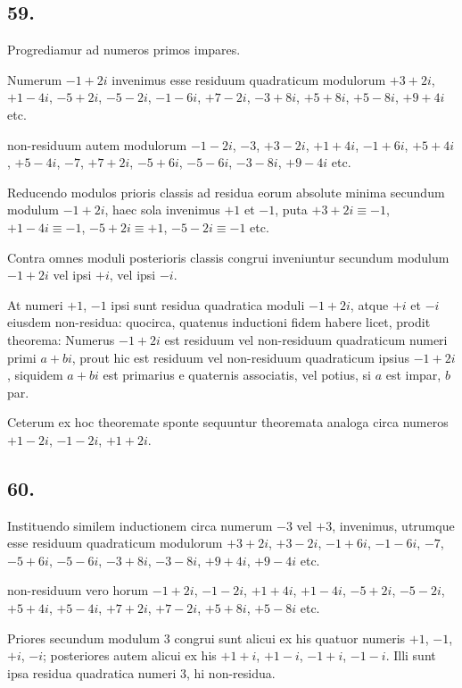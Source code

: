 \documentclass[twoside,12pt, showframe]{memoir}
\begin{document}
\subsection*{59.}
 
Progrediamur ad numeros primos impares.
 
Numerum \(-1+2 i\) invenimus esse residuum quadraticum modulorum \(+3+2 i\), \(+1-4 i\), \(-5+2 i\), \(-5-2 i\), \(-1-6 i\), \(+7-2 i\), \(-3+8 i\), \(+5+8 i\), \(+5-8 i\), \(+9+4 i\) etc.
 
non-residuum autem modulorum \(-1-2 i\), \(-3\), \(+3-2 i\), \(+1+4 i\), \(-1+6 i\), \(+5+4 i\), \(+5-4 i\), \(-7\), \(+7+2 i\), \(-5+6 i\), \(-5-6 i\), \(-3-8 i\), \(+9-4 i\) etc.
 
Reducendo modulos prioris classis ad residua eorum absolute minima secundum modulum \(-1+2 i\), haec sola invenimus \(+1\) et \(-1\), puta \(+3+2 i \equiv-1\), \(+1-4 i \equiv-1\), \(-5+2 i \equiv+1\), \(-5-2 i \equiv-1\) etc.
 
Contra omnes moduli posterioris classis congrui inveniuntur secundum modulum \(-1+2 i\) vel ipsi \(+i\), vel ipsi \(-i\).
 
At numeri \(+1\), \(-1\) ipsi sunt residua quadratica moduli \(-1+2 i\), atque \(+i\) et \(-i\) eiusdem non-residua: quocirca, quatenus inductioni fidem habere licet, prodit theorema: Numerus \(-1+2 i\) est residuum vel non-residuum quadraticum numeri primi \(a+b i\), prout hic est residuum vel non-residuum quadraticum ipsius \(-1+2 i\), siquidem \(a+b i\) est primarius e quaternis associatis, vel potius, si \(a\) est impar, \(b\) par.
 
Ceterum ex hoc theoremate sponte sequuntur theoremata analoga circa numeros \(+1-2 i\), \(-1-2 i\), \(+1+2 i\).

\subsection*{60.}
 
Instituendo similem inductionem circa numerum \(-3\) vel \(+3\), invenimus, utrumque esse residuum quadraticum modulorum \(+3+2 i\), \(+3-2 i\),\clearpage\noindent%
\(-1+6 i\), \(-1-6 i\), \(-7\), \(-5+6 i\), \(-5-6 i\), \(-3+8 i\), \(-3-8 i\), \(+9+4 i\), \(+9-4 i\) etc.
 
non-residuum vero horum \(-1+2 i\), \(-1-2 i\), \(+1+4 i\), \(+1-4 i\), \(-5+2 i\), \(-5-2 i\), \(+5+4 i\), \(+5-4 i\), \(+7+2 i\), \(+7-2 i\), \(+5+8 i\), \(+5-8 i\) etc.
 
Priores secundum modulum 3 congrui sunt alicui ex his quatuor numeris \(+1\), \(-1\), \(+i\), \(-i\); posteriores autem alicui ex his \(+1+i\), \(+1-i\), \(-1+i\), \(-1-i\). Illi sunt ipsa residua quadratica numeri 3, hi non-residua.
 
\end{document}
